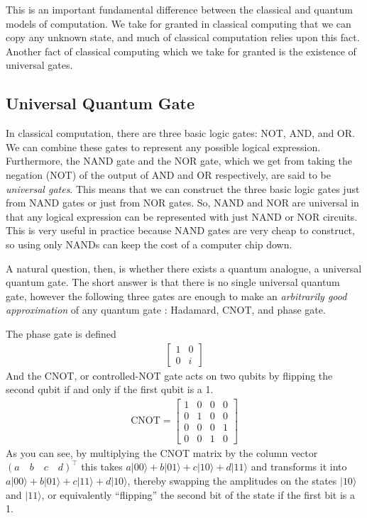 \documentclass[12pt,twoside]{reedthesis}
\theoremstyle{definition}
\newcommand{\ket}[1]{\ensuremath{\lvert #1\rangle}\xspace}
\begin{document}
This is an important fundamental difference between the classical and quantum models of computation. We take for granted in classical computing that we can copy any unknown state, and much of classical computation relies upon this fact. Another fact of classical computing which we take for granted is the existence of universal gates.

\subsection{Universal Quantum Gate}
In classical computation, there are three basic logic gates: NOT, AND, and OR. We can combine these gates to represent any possible logical expression. Furthermore, the NAND gate and the NOR gate, which we get from taking the negation (NOT) of the output of AND and OR respectively, are said to be \textit{universal gates}. This means that we can construct the three basic logic gates just from NAND gates or just from NOR gates. So, NAND and NOR are universal in that any logical expression can be represented with just NAND or NOR circuits. This is very useful in practice because NAND gates are very cheap to construct, so using only NANDs can keep the cost of a computer chip down.

A natural question, then, is whether there exists a quantum analogue, a universal quantum gate. The short answer is that there is no single universal quantum gate, however the following three gates are enough to make an \textit{arbitrarily good approximation} of any quantum gate \citep{nielsenchuang}: Hadamard, CNOT, and phase gate. 

The phase gate is defined
\begin{align}
\begin{bmatrix}
1 & 0\\
0 & i 
\end{bmatrix}
\end{align}
And the CNOT, or controlled-NOT gate acts on two qubits by flipping the second qubit if and only if the first qubit is a 1. 
\begin{align}
\text{CNOT} = \begin{bmatrix}
1 & 0 & 0 & 0 \\
0 & 1 & 0 & 0 \\
0 & 0 & 0 & 1 \\
0 & 0 & 1 & 0
\end{bmatrix}
\end{align}
As you can see, by multiplying the CNOT matrix by the column vector $(a\quad b\quad c\quad d)^\intercal$ this takes $a\ket{00} + b\ket{01} + c\ket{10} + d\ket{11}$ and transforms it into $a\ket{00} + b\ket{01} + c\ket{11} + d\ket{10}$, thereby swapping the amplitudes on the states $\ket{10}$ and $\ket{11}$, or equivalently ``flipping'' the second bit of the state if the first bit is a 1. 
\end{document}
